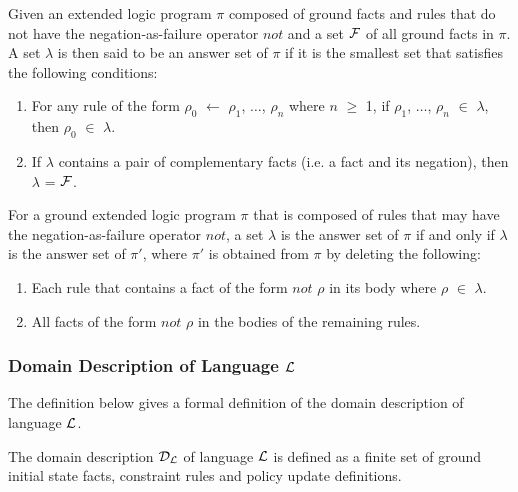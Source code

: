 \documentclass[glov2,twocolumn,final]{svjour2}
\newenvironment{vdefinition}
  {\begin{definition}\hspace{0.1em}}
  {\end{definition}}
\begin{document}
      \begin{vdefinition}
        \label{def-ans}
        Given an extended logic program $\pi$ composed of ground facts and
        rules that do not have the negation-as-failure operator $not$ and a set
        ${\cal F}$ of all ground facts in $\pi$. A set $\lambda$ is then said to
        be an answer set of $\pi$ if it is the smallest set that satisfies the
        following conditions:

        \begin{enumerate}
          \item
            For any rule of the form $\rho_{0}$ $\leftarrow$ $\rho_{1}$,
            $\hdots$, $\rho_{n}$ where $n$ $\geq$ 1, if $\rho_{1}$, $\hdots$,
            $\rho_{n}$ $\in$ $\lambda$, then
            $\rho_{0}$ $\in$ $\lambda$.
          \item
            If $\lambda$ contains a pair of complementary facts (i.e. a fact and
            its negation), then $\lambda$ = ${\cal F}$.
        \end{enumerate}

        For a ground extended logic program $\pi$ that is composed of rules
        that may have the negation-as-failure operator $not$, a set $\lambda$ is
        the answer set of $\pi$ if and only if $\lambda$ is the answer set of
        $\pi'$, where $\pi'$ is obtained from $\pi$ by deleting the following:

        \begin{enumerate}
          \item
            Each rule that contains a fact of the form $not$ $\rho$ in its body
            where $\rho$ $\in$ $\lambda$.
          \item
            All facts of the form $not$ $\rho$ in the bodies of the remaining
            rules.
        \end{enumerate}
      \end{vdefinition}

      \subsubsection{Domain Description of Language ${\cal L}$}

        The definition below gives a formal definition of the domain
        description of language ${\cal L}$.

        \begin{vdefinition}
          \label{def-domain}
          The domain description ${\cal D}_{\cal L}$ of language ${\cal L}$ is
          defined as a finite set of ground initial state facts, constraint
          rules and policy update definitions.
        \end{vdefinition}
\end{document}
